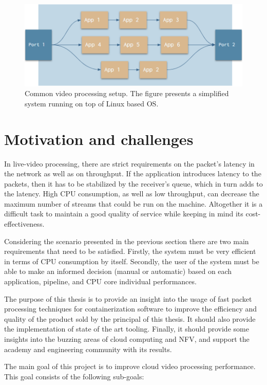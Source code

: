 \documentclass[english]{kththesis}
\begin{document}
\begin{figure}[!ht]
  \centering
    \includegraphics[width=1\textwidth]{Fig1}
  \caption{Common video processing setup. The figure presents a simplified system running on top of Linux based OS.}
  \label{fig:commonsetup}
\end{figure}

\section{Motivation and challenges}
\label{sec:motivation}
In live-video processing, there are strict requirements on the packet’s latency in the network as well as on throughput. If the application introduces latency to the packets, then it has to be stabilized by the receiver’s queue, which in turn adds to the latency. High CPU consumption, as well as low throughput, can decrease the maximum number of streams that could be run on the machine. Altogether it is a difficult task to maintain a good quality of service while keeping in mind its cost-effectiveness.

Considering the scenario presented in the previous section there are two main requirements that need to be satisfied. Firstly, the system must be very efficient in terms of CPU consumption by itself. Secondly, the user of the system must be able to make an informed decision (manual or automatic) based on each application, pipeline, and CPU core individual performances.

The purpose of this thesis is to provide an insight into the usage of fast packet processing techniques for containerization software to improve the efficiency and quality of the product sold by the principal of this thesis. It should also provide the implementation of state of the art tooling. Finally, it should provide some insights into the buzzing areas of cloud computing and \gls{NFV}, and support the academy and engineering community with its results.

The main goal of this project is to improve cloud video processing performance. This goal consists of the following sub-goals: 
\end{document}
